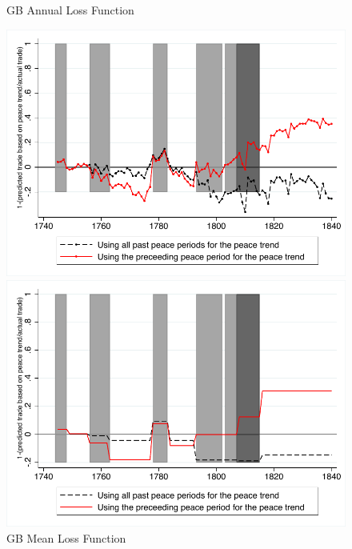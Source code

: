 \documentclass[12pt,a4paper,notitlepage,english]{article}
\begin{document}
\begin{appendix}
\begin{center}
\begin{figure}[h!]
\caption{GB Annual Loss Function}
\label{GBannual_loss_function}
\centering
\includegraphics[scale=0.9]{GBAnnual_loss_function.pdf}
\caption{GB Mean Loss Function}
\label{GBmean_loss_function}
\includegraphics[scale=0.9]{GBMean_loss_function.pdf}
\end{figure}
\end{center}


\end{appendix}
\end{document}
